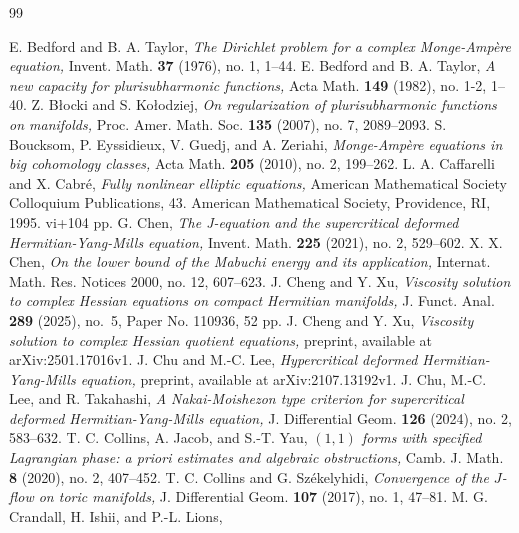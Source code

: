 \documentclass{amsart}
\numberwithin{equation}{section}
\theoremstyle{plain}
\theoremstyle{definition}
\theoremstyle{remark}
\begin{document}
\begin{thebibliography}{99}

  E. Bedford and B. A. Taylor, 
  \textit{The Dirichlet problem for a complex Monge-Ampère equation,} 
  Invent. Math. \textbf{37} (1976), no. 1, 1--44.
  E. Bedford and B. A. Taylor, 
  \textit{A new capacity for plurisubharmonic functions,} 
  Acta Math. \textbf{149} (1982), no. 1-2, 1--40.
  Z. Błocki and S. Kołodziej, 
  \textit{On regularization of plurisubharmonic functions on manifolds,} 
  Proc. Amer. Math. Soc. \textbf{135} (2007), no. 7, 2089--2093.
  S. Boucksom, P. Eyssidieux, V. Guedj, and A. Zeriahi, 
  \textit{Monge-Amp{\`e}re equations in big cohomology classes,}
  Acta Math. \textbf{205} (2010), no. 2, 199--262.
  L. A. Caffarelli and X. Cabré, 
  \textit{Fully nonlinear elliptic equations,} 
  American Mathematical Society Colloquium Publications, 43. American Mathematical Society, Providence, RI, 1995. {\rm vi}+104 pp.
  G. Chen, 
  \textit{The J-equation and the supercritical deformed Hermitian-Yang-Mills equation,} 
  Invent. Math. \textbf{225} (2021), no. 2, 529--602. 
  X. X. Chen, 
  \textit{On the lower bound of the Mabuchi energy and its application,}
  Internat. Math. Res. Notices 2000, no. 12, 607--623. 
  J. Cheng and Y. Xu, 
  \textit{Viscosity solution to complex Hessian equations on compact Hermitian manifolds,} J. Funct. Anal. {\bf 289} (2025), no.~5, Paper No. 110936, 52 pp.
  J. Cheng and Y. Xu,
  \textit{Viscosity solution to complex Hessian quotient equations,}
  preprint, available at arXiv:2501.17016v1.
  J. Chu and M.-C. Lee,
  \textit{Hypercritical deformed Hermitian-Yang-Mills equation,}
  preprint, available at arXiv:2107.13192v1.
  J. Chu, M.-C. Lee, and R. Takahashi, 
  \textit{A Nakai-Moishezon type criterion for supercritical deformed Hermitian-Yang-Mills equation,} 
  J. Differential Geom. \textbf{126} (2024), no. 2, 583--632.
  T. C. Collins, A. Jacob, and S.-T. Yau, 
  \textit{$(1,1)$ forms with specified Lagrangian phase: a priori estimates and algebraic obstructions,}
  Camb. J. Math. \textbf{8} (2020), no. 2, 407--452.
  T. C. Collins and G. Sz{\'e}kelyhidi, 
  \textit{Convergence of the $J$-flow on toric manifolds,} 
  J. Differential Geom. \textbf{107} (2017), no. 1, 47--81.
  M. G. Crandall, H. Ishii, and P.-L. Lions, 

\end{thebibliography}
\end{document}
